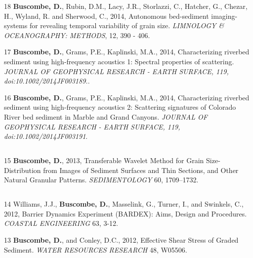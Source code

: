 \documentclass[margin,line]{resume}
\begin{document}
\begin{resume}
\begin{footnotesize}
\begin{list1}
	\item[18]  {\bf Buscombe, D.}, Rubin, D.M., Lacy, J.R., Storlazzi, C., Hatcher, G., Chezar, H., Wyland, R. and Sherwood, C., 2014, Autonomous bed-sediment imaging-systems for revealing temporal variability of grain size. {\sl LIMNOLOGY \& OCEANOGRAPHY: METHODS}, 12, 390 - 406. \\

	\item[17] {\bf Buscombe, D.}, Grams, P.E., Kaplinski, M.A., 2014, Characterizing riverbed sediment using high-frequency acoustics 1: Spectral properties of scattering. {\sl JOURNAL OF GEOPHYSICAL RESEARCH - EARTH SURFACE, 119, doi:10.1002/2014JF003189.}.\\

	\item[16] {\bf Buscombe, D.}, Grams, P.E., Kaplinski, M.A., 2014, Characterizing riverbed sediment using high-frequency acoustics 2: Scattering signatures of Colorado River bed sediment in Marble and Grand Canyons. {\sl JOURNAL OF GEOPHYSICAL RESEARCH - EARTH SURFACE, 119, doi:10.1002/2014JF003191}.

	\end{list1}

	\subsection{}
	\begin{list1}
        \item[15] {\bf Buscombe, D.}, 2013, Transferable Wavelet Method for Grain Size-Distribution from Images of Sediment Surfaces and Thin Sections, and Other Natural Granular Patterns. {\sl SEDIMENTOLOGY} 60, 1709--1732. 

	\end{list1}

	\subsection{}
	\begin{list1}
	\item[14] Williams, J.J., {\bf Buscombe, D.}, Masselink, G., Turner, I., and Swinkels, C., 2012, Barrier Dynamics Experiment (BARDEX): Aims, Design and Procedures. {\sl COASTAL ENGINEERING} 63, 3-12.\\

	\item[13] {\bf Buscombe, D.}, and Conley, D.C., 2012, Effective Shear Stress of Graded Sediment. {\sl WATER RESOURCES RESEARCH} 48, W05506.\\


\end{list1}
\end{footnotesize}
\end{resume}
\end{document}
